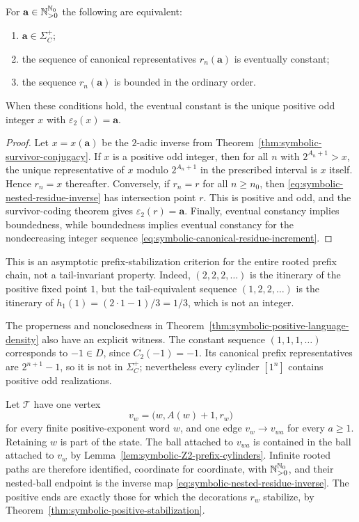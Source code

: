 \begin{theorem}
\label{thm:symbolic-positive-stabilization}
For $\mathbf a\in\mathbb{N}_{>0}^{\mathbb{N}_{0}}$ the following are equivalent:
\begin{enumerate}[label=\textup{(\roman*)}]
\item $\mathbf a\in\Sigma_C^+$;
\item the sequence of canonical representatives $r_n(\mathbf a)$ is
eventually constant;
\item the sequence $r_n(\mathbf a)$ is bounded in the ordinary order.
\end{enumerate}
When these conditions hold, the eventual constant is the unique positive
odd integer $x$ with $\varepsilon_2(x)=\mathbf a$.
\end{theorem}

\begin{proof}
Let $x=x(\mathbf a)$ be the $2$-adic inverse from
Theorem~\ref{thm:symbolic-survivor-conjugacy}.  If $x$ is a positive odd
integer, then for all $n$ with $2^{A_n+1}>x$, the unique representative of
$x$ modulo $2^{A_n+1}$ in the prescribed interval is $x$ itself.  Hence
$r_n=x$ thereafter.  Conversely, if $r_n=r$ for all $n\geq n_0$, then
\eqref{eq:symbolic-nested-residue-inverse} has intersection point $r$.
This is positive and odd, and the survivor-coding theorem gives
$\varepsilon_2(r)=\mathbf a$.
Finally, eventual constancy implies boundedness, while boundedness implies
eventual constancy for the nondecreasing integer sequence
\eqref{eq:symbolic-canonical-residue-increment}.
\end{proof}

This is an asymptotic prefix-stabilization criterion for the entire rooted
prefix chain, not a tail-invariant property.  Indeed, $(2,2,2,\ldots)$ is the
itinerary of the positive fixed point $1$, but the tail-equivalent sequence
$(1,2,2,\ldots)$ is the itinerary of
$h_1(1)=(2\cdot1-1)/3=1/3$, which is not an integer.

The properness and nonclosedness in
Theorem~\ref{thm:symbolic-positive-language-density} also have an explicit
witness.  The constant sequence $(1,1,1,\ldots)$ corresponds to $-1\in D$,
since $C_2(-1)=-1$.  Its canonical prefix representatives are
$2^{n+1}-1$, so it is not in $\Sigma_C^+$; nevertheless every cylinder
$[1^n]$ contains positive odd realizations.

\begin{construction}
\label{construction:symbolic-prefix-refinement-tree}
Let $\mathcal T$ have one vertex
\[
 v_w=\bigl(w,A(w)+1,r_w\bigr)
\]
for every finite positive-exponent word $w$, and one edge $v_w\to v_{wa}$
for every $a\geq1$.  Retaining $w$ is part of the state.  The ball attached
to $v_{wa}$ is contained in the ball attached to $v_w$ by
Lemma~\ref{lem:symbolic-Z2-prefix-cylinders}.  Infinite rooted paths are
therefore identified, coordinate for coordinate, with
$\mathbb{N}_{>0}^{\mathbb{N}_{0}}$, and their nested-ball endpoint is the inverse map
\eqref{eq:symbolic-nested-residue-inverse}.  The positive ends are exactly
those for which the decorations $r_w$ stabilize, by
Theorem~\ref{thm:symbolic-positive-stabilization}.
\end{construction}

